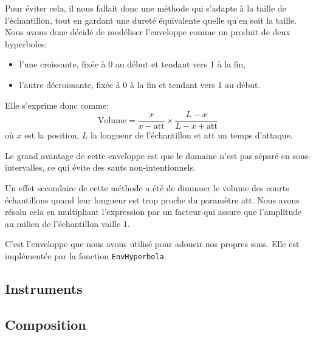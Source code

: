 \documentclass[a4paper,12pt]{article}
\begin{document}
\begin{itemize}
        Pour éviter cela, il nous fallait donc une méthode qui s'adapte
        à la taille de l'échantillon, tout en gardant une dureté équivalente
        quelle qu'en soit la taille.
        Nous avons donc décidé de modéliser l'enveloppe comme un produit
        de deux hyperboles:
        \begin{itemize}
            \item l'une croissante,
                fixée à 0 au début et tendant vers 1 à la fin,
            \item l'autre décroissante,
                fixée à 0 à la fin et tendant vers 1 au début.
        \end{itemize}
        Elle s'exprime donc comme:
        \[
            \mbox{Volume} = \frac{x}{x-\mbox{att}} \times
                \frac{L-x}{L-x+\mbox{att}}
        \]
        où $x$ est la position, $L$ la longueur de l'échantillon et
        att un temps d'attaque.
        
        Le grand avantage de cette enveloppe est que le domaine n'est pas
        séparé en sous-intervalles, ce qui évite des sauts non-intentionnels.
        
        Un effet secondaire de cette méthode a été de diminuer le volume des
        courts échantillons quand leur longueur est trop proche du paramètre
        att.
        Nous avons résolu cela en multipliant l'expression par un facteur
        qui assure que l'amplitude au milieu de l'échantillon vaille 1.
        
        C'est l'enveloppe que nous avons utilisé pour adoucir nos propres sons.
        Elle est implémentée par la fonction \texttt{EnvHyperbola}.
\end{itemize}

\subsection{Instruments}

\subsection{Composition}
\end{document}
